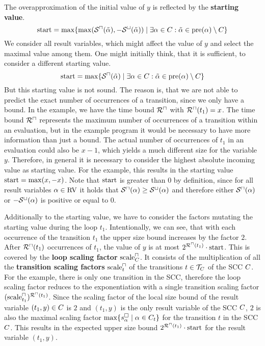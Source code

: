 The overapproximation of the initial value of $y$ is reflected by the \textbf{starting value}.
\[ \text{start} = \max \lbrace \max({\mathcal{S}^\sqcap}(\tilde{\alpha}), -{\mathcal{S}^\sqcup}(\tilde{\alpha})) \mid \exists \alpha \in C: \tilde{\alpha} \in \text{pre}(\alpha) \setminus C \rbrace \]
We consider all result variables, which might affect the value of $y$ and select the maximal value among them.
One might initially think, that it is sufficient, to consider a different starting value.
\[ \text{start} = \max \lbrace {\mathcal{S}^\sqcap}(\tilde{\alpha}) \mid \exists \alpha \in C: \tilde{\alpha} \in \text{pre}(\alpha) \setminus C \rbrace \]
But this starting value is not sound.
The reason is, that we are not able to predict the exact number of occurrences of a transition, since we only have a bound.
In the example, we have the time bound ${\mathcal{R}^\sqcap}$ with ${\mathcal{R}^\sqcap}(t_1) = x$.
The time bound ${\mathcal{R}^\sqcap}$ represents the maximum number of occurrences of a transition within an evaluation, but in the example program it would be necessary to have more information than just a bound.
The actual number of occurrences of $t_1$ in an evaluation could also be $x-1$, which yields a much different size for the variable $y$.
Therefore, in general it is necessary to consider the highest absolute incoming value as starting value.
For the example, this results in the starting value $\text{start} = \max(x, -x)$.
Note that $\text{start}$ is greater than $0$ by definition, since for all result variables $\alpha \in \text{RV}$ it holds that ${\mathcal{S}^\sqcap}(\alpha) \geq {\mathcal{S}^\sqcup}(\alpha)$ and therefore either ${\mathcal{S}^\sqcap}(\alpha)$ or $-{\mathcal{S}^\sqcup}(\alpha)$ is positive or equal to $0$.

Additionally to the starting value, we have to consider the factors mutating the starting value during the loop $t_1$.
Intentionally, we can see, that with each occurrence of the transition $t_1$ the upper size bound increases by the factor $2$.
After ${\mathcal{R}^\sqcap}(t_1)$ occurrences of $t_1$, the value of $y$ is at most $2^{{\mathcal{R}^\sqcap}(t_1)} \cdot \text{start}$.
This is covered by the \textbf{loop scaling factor} $\text{scale}^\sqcap_C$.
It consists of the multiplication of all the \textbf{transition scaling factors} $\text{scale}^\sqcap_t$ of the transitions $t \in \mathcal{T}_C$ of the SCC $C$.
For the example, there is only one transition in the SCC, therefore the loop scaling factor reduces to the exponentiation with a single transition scaling factor $(\text{scale}^\sqcap_{t_1})^{{\mathcal{R}^\sqcap}(t_1)}$.
Since the scaling factor of the local size bound of the result variable $(t_1,y) \in C$ is $2$ and $(t_1,y)$ is the only result variable of the SCC $C$, $2$ is also the maximal scaling factor $\max \lbrace s^\square_{\alpha} \mid \alpha \in C_t \rbrace$ for the transition $t$ in the SCC $C$.
This results in the expected upper size bound $2^{{\mathcal{R}^\sqcap}(t_1)} \cdot \text{start}$ for the result variable $(t_1,y)$.

